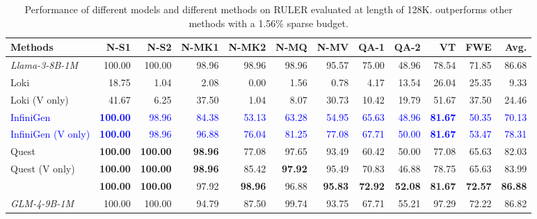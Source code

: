 \begin{table}[t]
\centering
\caption{Performance of different models and different methods on RULER \citep{hsieh2024ruler} evaluated at length of 128K. \Sys outperforms other methods with a 1.56\% sparse budget. }
\setlength{\tabcolsep}{3.1pt} %
\footnotesize
\begin{tabular}{l|rrrrrrrrrr|r}
\toprule
Methods &  N-S1 & N-S2 & N-MK1&N-MK2&N-MQ&N-MV&QA-1&QA-2&VT&FWE &Avg.\\ \midrule
	\textit{Llama-3-8B-1M} & 100.00&100.00&98.96&98.96&98.96&95.57&75.00&48.96&78.54&71.85 & 86.68\\
    Loki & 18.75 & 1.04 & 2.08 & 0.00 & 1.56 & 0.78 & 4.17 & 13.54 & 26.04 & 25.35 & 9.33\\
    Loki (V only) & 41.67 & 6.25 & 37.50 & 1.04 & 8.07 & 30.73 & 10.42 & 19.79 & 51.67 & 37.50& 24.46 \\
    
    \textcolor{blue}{InfiniGen} & \textcolor{blue}{\textbf{100.00}} & \textcolor{blue}{98.96} & \textcolor{blue}{84.38} & \textcolor{blue}{53.13} & \textcolor{blue}{63.28} & \textcolor{blue}{54.95} & \textcolor{blue}{65.63} & \textcolor{blue}{48.96} & \textcolor{blue}{\textbf{81.67}} & \textcolor{blue}{50.35} & \textcolor{blue}{70.13} \\
    \textcolor{blue}{InfiniGen (V only)} & \textcolor{blue}{\textbf{100.00}} & \textcolor{blue}{98.96} & \textcolor{blue}{96.88} & \textcolor{blue}{76.04} & \textcolor{blue}{81.25} & \textcolor{blue}{77.08} & \textcolor{blue}{67.71} & \textcolor{blue}{50.00} & \textcolor{blue}{\textbf{81.67}} & \textcolor{blue}{53.47} & \textcolor{blue}{78.31} \\
    
    Quest & \textbf{100.00} & \textbf{100.00}& \textbf{98.96} & 77.08 & 97.65 & 93.49 & 60.42 & 50.00 & 77.08 & 65.63 & 82.03  \\
    Quest (V only) & \textbf{100.00} & \textbf{100.00} &\textbf{98.96} & 85.42 & \textbf{97.92} & 95.49 & 70.83 & 46.88 & 78.75 & 65.63&83.99\\
	\rowcolor{cyan!10}
	\Sys  & \textbf{100.00} & \textbf{100.00} & 97.92&\textbf{98.96}&96.88&\textbf{95.83}&\textbf{72.92}&\textbf{52.08}&\textbf{81.67}&\textbf{72.57}&\textbf{86.88}\\
	
    \midrule
    \textit{GLM-4-9B-1M}&100.00 & 100.00 & 94.79&87.50&99.74&93.75&67.71&55.21&97.29&72.22&86.82 \\
    

\end{tabular}
\end{table}
